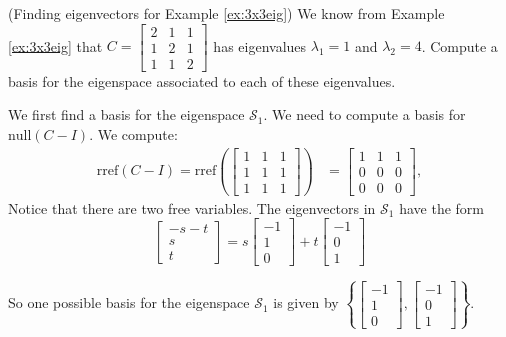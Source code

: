\documentclass{ximera}
\begin{document}
\begin{example}\label{ex:eigvectors3x3eig} (Finding eigenvectors for Example \ref{ex:3x3eig})
We know from Example \ref{ex:3x3eig} that $C=\begin{bmatrix} 2 & 1 & 1\\ 1 & 2 & 1\\ 1 & 1 & 2\end{bmatrix}$ has eigenvalues $\lambda_1=1$ and $\lambda_2=4$.  Compute a basis for the eigenspace associated to each of these eigenvalues.
\begin{explanation}
We first find a basis for the eigenspace $\mathcal{S}_1$.  We need to compute a basis for $\mbox{null}(C-I)$.  We compute:
\begin{align*}\mbox{rref}(C-I)=\mbox{rref}\left(\begin{bmatrix} 1 & 1 & 1\\ 1 & 1 & 1\\ 1 & 1 & 1\end{bmatrix}\right)&=\begin{bmatrix} 1 & 1 & 1\\ 0 & 0 & 0\\ 0 & 0 & 0\end{bmatrix},
\end{align*}
Notice that there are two free variables.  %
The eigenvectors in $\mathcal{S}_1$ have the form
$$\begin{bmatrix}-s-t\\s\\t\end{bmatrix} = s\begin{bmatrix}-1\\1\\0\end{bmatrix} + t\begin{bmatrix}-1\\0\\1\end{bmatrix}$$

So one possible basis for the eigenspace $\mathcal{S}_1$ is given by $\left\{\begin{bmatrix}-1\\1\\0\end{bmatrix}, \begin{bmatrix}-1\\0\\1\end{bmatrix}\right\}$.


\end{explanation}
\end{example}
\end{document}

